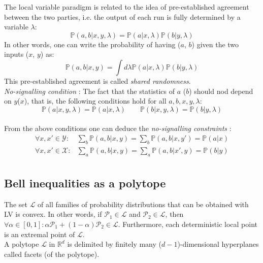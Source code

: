 \documentclass[12pt]{article}
\renewcommand{\L}{\mathcal{L}}
\begin{document}
\begin{multicols}{2}
The local variable paradigm is related to the idea of pre-established agreement
between the two parties, i.e. the output of each run is fully determined by a
variable $\lambda$:
\begin{equation}
	\mathbb{P}(a,b|x,y, \lambda) =
		\mathbb{P}(a|x, \lambda) \mathbb{P}(b|y, \lambda)
\end{equation}
In other words, one can write the probability of having ($a$, $b$) given the two
inputs ($x$, $y$) as:
\begin{equation}
	\mathbb{P}(a, b|x, y) =
		\int d\lambda\mathbb{P}(a|x, \lambda) \mathbb{P}(b|y, \lambda)
\end{equation}
This pre-established agreement is called \textit{shared randomness}.
\\\noindent
\textit{No-signalling condition} : The fact that the statistics of $a$ ($b$)
should nod depend on $y$($x$), that is, the following conditions hold for all
$a, b, x, y, \lambda$:
\begin{equation}
	\mathbb{P}(a|x, y, \lambda) = \mathbb{P}(a|x, \lambda)
	\qquad
	\mathbb{P}(b|x, y, \lambda) = \mathbb{P}(b|y, \lambda)
\end{equation}
\\\noindent
From the above conditions one can deduce the \textit{no-signalling constraints} :
\begin{equation}
	\begin{aligned}
		\forall x, x' \in \mathcal{Y}: &
			\sum_b \mathbb{P}(a,b|x,y) =
			\sum_b \mathbb{P}(a,b|x,y') = \mathbb{P}(a|x) \\
		\forall x, x' \in \mathcal{X}: &
			\sum_a \mathbb{P}(a,b|x,y) =
			\sum_a \mathbb{P}(a,b|x',y) = \mathbb{P}(b|y) \\
	\end{aligned}
\end{equation}

\subsection*{Bell inequalities as a polytope}
The set $\L$ of all families of probability distributions that can be obtained
with LV is convex. In other words, if $\mathcal P_1 \in \L$ and $\mathcal P_2
\in \L$, then $\forall \alpha \in [0, 1] : \alpha \mathcal P_1 + (1-\alpha)
\mathcal P_2 \in \L $. Furthermore, each deterministic local point is an
extremal point of $\L$. \\\noindent A polytope $\L$ in $\mathbb R^d$ is
delimited by finitely many ($d-1$)-dimensional hyperplanes called facets (of the
polytope).


\end{multicols}
\end{document}
